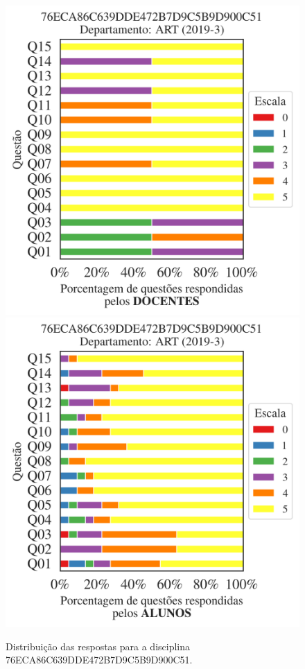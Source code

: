 \documentclass[a4paper,10pt]{article}
\begin{document}
\begin{figure}[h]
\centering
\includegraphics[width=0.485\linewidth]{analise_disciplina_departamento_ART_76ECA86C639DDE472B7D9C5B9D900C51_docentes.png}
\includegraphics[width=0.485\linewidth]{analise_disciplina_departamento_ART_76ECA86C639DDE472B7D9C5B9D900C51_alunos.png}
\caption{\label{fig:analise_geral_departamento}                Distribuição das respostas para a disciplina 76ECA86C639DDE472B7D9C5B9D900C51. }
\end{figure}
\end{document}
